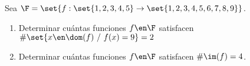 \ejExtra

Sea
$\F = \set{ f:\set{1,2,3,4,5} \to \set{1,2,3,4,5,6,7,8,9} }$.

\begin{enumerate}[label=\alph*)] 
        \item 
                Determinar cuántas funciones
                $f \en \F$ satisfacen $\#\set{x \en \dom(f)\ / \ f(x) = 9} = 2 $

        \item
                Determinar cuántas funciones
                $f \en \F$ satisfacen $\#\im(f) = 4$.
 \end{enumerate}

 
